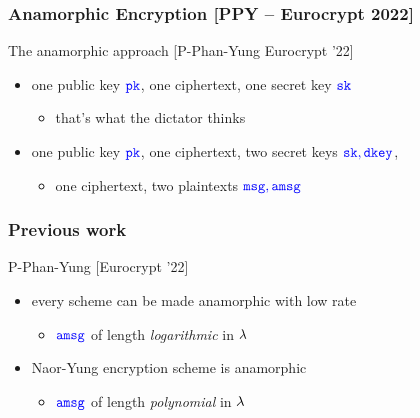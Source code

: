 \documentclass[]{beamer}
\begin{document}
\begin{frame}
\frametitle{Anamorphic Encryption [PPY -- Eurocrypt 2022]}

\begin{block}{The anamorphic approach [P-Phan-Yung Eurocrypt '22]}
\begin{itemize}
\item {\color{green} one} public key $\color{blue} {\mathtt{pk}}$, 
    {\color{green} one} ciphertext,
    {\color{green} one} secret key $\color{blue} {\mathtt{sk}}$
    \begin{itemize}
        \item \color{brown} that's what the dictator thinks
    \end{itemize}
\pause
\item {\color{green} one} public key $\color{blue} {\mathtt{pk}}$,
{\color{green} one} ciphertext,
{\color{purple} two} secret keys $\color{blue} {\mathtt{sk}},{\mathtt{dkey}}$, 
    \begin{itemize}
        \item {\color{green} one} ciphertext, {\color{purple} two}
            plaintexts $\color{blue} {\mathtt{msg}},{\mathtt{a}}{\mathtt{msg}}$
    \end{itemize}
\end{itemize}
\end{block}
\pause

\end{frame}

\begin{frame}

\frametitle{Previous work}
\begin{block}{P-Phan-Yung [Eurocrypt '22]}
\begin{itemize}
\item every scheme can be made anamorphic with low rate
    \begin{itemize}
        \item $\color{blue}{\mathtt{a}}{\mathtt{msg}}$ of length {\em\color{purple}logarithmic}
    in $\lambda$
    \end{itemize}
\item Naor-Yung encryption scheme is anamorphic
    \begin{itemize}
        \item $\color{blue}{\mathtt{a}}{\mathtt{msg}}$ of length {\em\color{purple}polynomial}
        in $\lambda$
    \end{itemize}
\end{itemize}
\end{block}


\end{frame}
\end{document}
